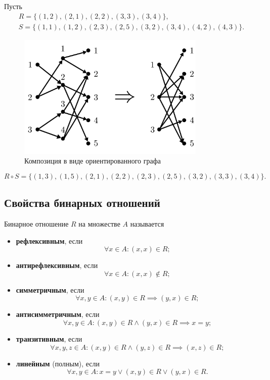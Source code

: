 \begin{example*}
    Пусть
    \begin{gather*}
        R = \{(1, 2), (2, 1), (2, 2), (3, 3), (3, 4)\}, \\
        S = \{(1, 1), (1, 2), (2, 3), (2, 5), (3, 2), (3, 4), (4, 2), (4, 3)\}.
    \end{gather*}

    \begin{figure}[H]
        \centering
        \includegraphics[width=0.8\textwidth]{images/composition-graph.png}
        \caption{Композиция в виде ориентированного графа}
    \end{figure}

    \[
        R \circ S = \{(1, 3), (1, 5), (2, 1), (2, 2), (2, 3), (2, 5), (3, 2), (3, 3), (3, 4)\}.
    \]
\end{example*}

\subsection{Свойства бинарных отношений}

Бинарное отношение \(R\) на множестве \(A\) называется
\begin{itemize}
    \item \textbf{рефлексивным}, если
          \[
              \forall x \in A : (x, x) \in R;
          \]
    \item \textbf{антирефлексивным}, если
          \[
              \forall x \in A : (x, x) \notin R;
          \]
    \item \textbf{симметричным}, если
          \[
              \forall x, y \in A : (x, y) \in R \implies (y, x) \in R ;
          \]
    \item \textbf{антисимметричным}, если
          \[
              \forall x, y \in A : (x, y) \in R \land (y, x) \in R \implies x = y;
          \]
    \item \textbf{транзитивным}, если
          \[
              \forall x, y, z \in A : (x, y) \in R \land (y, z) \in R \implies (x, z) \in R;
          \]
    \item \textbf{линейным} (полным), если
          \[
              \forall x, y \in A : x = y \lor (x, y) \in R \lor (y, x) \in R.
          \]
\end{itemize}

